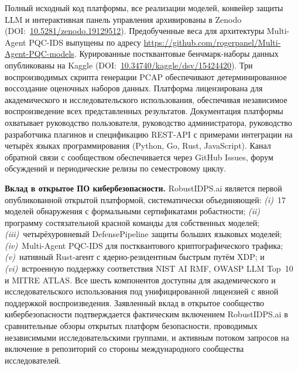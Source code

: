 \label{sec:opensource}%

Полный исходный код платформы, все реализации моделей, конвейер защиты LLM и интерактивная панель управления архивированы в Zenodo (DOI:~\url{10.5281/zenodo.19129512}). Предобученные веса для архитектуры Multi-Agent PQC-IDS выпущены по адресу \url{https://github.com/rogerpanel/Multi-Agent-PQC-models}. Курированные постквантовые бенчмарк-наборы данных опубликованы на Kaggle (DOI:~\url{10.34740/kaggle/dsv/15424420}). Три воспроизводимых скрипта генерации PCAP обеспечивают детерминированное воссоздание оценочных наборов данных. Платформа лицензирована для академического и исследовательского использования, обеспечивая независимое воспроизведение всех представленных результатов. Документация платформы охватывает руководство пользователя, руководство администратора, руководство разработчика плагинов и спецификацию REST-API с примерами интеграции на четырёх языках программирования (Python, Go, Rust, JavaScript). Канал обратной связи с сообществом обеспечивается через GitHub Issues, форум обсуждений и периодические релизы по семестровому циклу.

\noindent\textbf{Вклад в открытое ПО кибербезопасности.}
\textsf{RobustIDPS.ai} является первой опубликованной открытой
платформой, систематически объединяющей: \emph{(i)}~17 моделей
обнаружения с формальными сертификатами робастности; \emph{(ii)}~
программу состязательной красной команды для собственных моделей;
\emph{(iii)}~четырёхуровневый DefensePipeline защиты больших
языковых моделей; \emph{(iv)}~Multi-Agent PQC-IDS для постквантового
криптографического трафика; \emph{(v)}~нативный Rust-агент с
ядерно-резидентным быстрым путём XDP; и \emph{(vi)}~встроенную
поддержку соответствия NIST AI RMF, OWASP LLM Top~10 и MITRE
ATLAS. Все шесть компонентов доступны для академического и
исследовательского использования под унифицированной лицензией с
явной поддержкой воспроизведения. Заявленный вклад в открытое
сообщество кибербезопасности подтверждается фактическим
включением \textsf{RobustIDPS.ai} в сравнительные обзоры
открытых платформ безопасности, проводимых независимыми
исследовательскими группами, и активным потоком запросов на
включение в репозиторий со стороны международного сообщества
исследователей.

